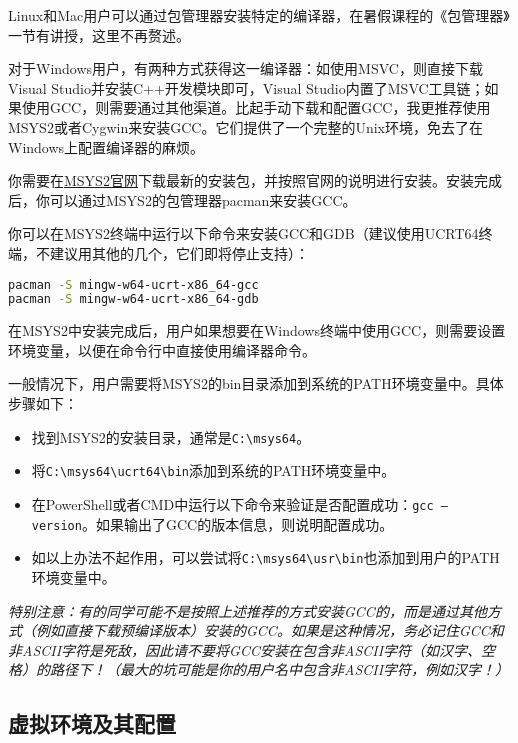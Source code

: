 \documentclass[../main.tex]{subfiles}
\begin{document}
Linux和Mac用户可以通过包管理器安装特定的编译器，在暑假课程的《包管理器》一节有讲授，这里不再赘述。

对于Windows用户，有两种方式获得这一编译器：如使用MSVC，则直接下载Visual Studio并安装C++开发模块即可，Visual Studio内置了MSVC工具链；如果使用GCC，则需要通过其他渠道。比起手动下载和配置GCC，我更推荐使用MSYS2或者Cygwin来安装GCC。它们提供了一个完整的Unix环境，免去了在Windows上配置编译器的麻烦。

你需要在\href{https://www.msys2.org/}{MSYS2官网}下载最新的安装包，并按照官网的说明进行安装。安装完成后，你可以通过MSYS2的包管理器pacman来安装GCC。

你可以在MSYS2终端中运行以下命令来安装GCC和GDB（建议使用UCRT64终端，不建议用其他的几个，它们即将停止支持）：

\begin{lstlisting}[language=bash]
pacman -S mingw-w64-ucrt-x86_64-gcc
pacman -S mingw-w64-ucrt-x86_64-gdb
\end{lstlisting}

在MSYS2中安装完成后，用户如果想要在Windows终端中使用GCC，则需要设置环境变量，以便在命令行中直接使用编译器命令。

一般情况下，用户需要将MSYS2的bin目录添加到系统的PATH环境变量中。具体步骤如下：

\begin{itemize}
  \item 找到MSYS2的安装目录，通常是\texttt{C:\textbackslash msys64}。
  \item 将\texttt{C:\textbackslash msys64\textbackslash ucrt64\textbackslash bin}添加到系统的PATH环境变量中。
  \item 在PowerShell或者CMD中运行以下命令来验证是否配置成功：\texttt{gcc --version}。如果输出了GCC的版本信息，则说明配置成功。
  \item 如以上办法不起作用，可以尝试将\texttt{C:\textbackslash msys64\textbackslash usr\textbackslash bin}也添加到用户的PATH环境变量中。
\end{itemize}

\emph{特别注意：有的同学可能不是按照上述推荐的方式安装GCC的，而是通过其他方式（例如直接下载预编译版本）安装的GCC。如果是这种情况，务必记住GCC和非ASCII字符是死敌，因此请不要将GCC安装在包含非ASCII字符（如汉字、空格）的路径下！（最大的坑可能是你的用户名中包含非ASCII字符，例如汉字！）}

\subsection{虚拟环境及其配置}
\end{document}
